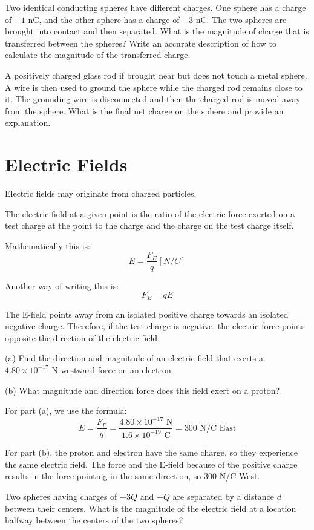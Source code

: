 \documentclass[../em.tex]{subfiles}
\begin{document}
\ex Two identical conducting spheres have different charges. One sphere has a charge of $+1$ nC, and the other sphere has a charge of $-3$ nC. 
The two spheres are brought into contact and then separated. What is the magnitude of charge that is transferred between the spheres? 
Write an accurate description of how to calculate the magnitude of the transferred charge.

\ex A positively charged glass rod if brought near but does not touch a metal sphere. 
A wire is then used to ground the sphere while the charged rod remains close to it. The grounding wire is disconnected and then the charged 
rod is moved away from the sphere. What is the final net charge on the sphere and provide an explanation.

\pagebreak
\section{Electric Fields}
Electric fields may originate from charged particles.

The electric field at a given point is the ratio of the electric force exerted on a test 
charge at the point to the charge and the charge on the test charge itself.

Mathematically this is:
\[E = \frac{F_E}{q}[N/C]\]

Another way of writing this is:
\[F_E=qE\]

The E-field points away from an isolated positive charge towards an 
isolated negative charge. Therefore, if the test charge is negative, 
the electric force points opposite the direction of the electric field.

\begin{example}
(a) Find the direction and magnitude of an electric field that exerts a $4.80\times10^{-17}$ N westward force on an electron. 

(b) What magnitude and direction force does this field exert on a proton?

For part (a), we use the formula:
\[E=\frac{F_E}{q}=\frac{4.80\times10^{-17}\text{ N}}{1.6\times10^{-19}\text{ C}}=300  \text{ N/C East}\]

For part (b), the proton and electron have the same charge, so they experience the same electric field. 
The force and the E-field because of the positive charge results in the force pointing in the same direction, so 300 N/C West.
\end{example}

\ex Two spheres having charges of $+3Q$ and $-Q$ are separated by a distance $d$ between their centers. What is the magnitude of the electric field at a location halfway between the centers of the two spheres?
\end{document}
